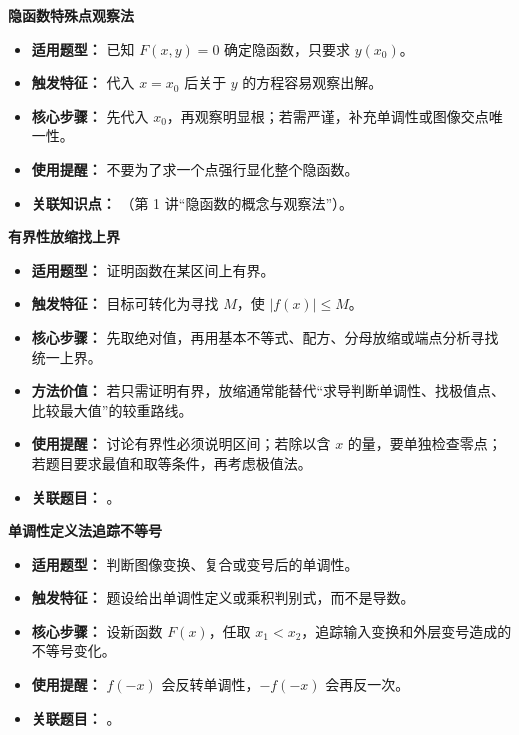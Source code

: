 \begin{knowledgeBox}
\textbf{隐函数特殊点观察法}

\begin{itemize}
  \item \textbf{适用题型：} 已知 \(F(x,y)=0\) 确定隐函数，只要求 \(y(x_0)\)。
  \item \textbf{触发特征：} 代入 \(x=x_0\) 后关于 \(y\) 的方程容易观察出解。
  \item \textbf{核心步骤：} 先代入 \(x_0\)，再观察明显根；若需严谨，补充单调性或图像交点唯一性。
  \item \textbf{使用提醒：} 不要为了求一个点强行显化整个隐函数。
  \item \textbf{关联知识点：} （第 1 讲“隐函数的概念与观察法”）。
\end{itemize}

\textbf{有界性放缩找上界}

\begin{itemize}
  \item \textbf{适用题型：} 证明函数在某区间上有界。
  \item \textbf{触发特征：} 目标可转化为寻找 \(M\)，使 \(|f(x)|\le M\)。
  \item \textbf{核心步骤：} 先取绝对值，再用基本不等式、配方、分母放缩或端点分析寻找统一上界。
  \item \textbf{方法价值：} 若只需证明有界，放缩通常能替代“求导判断单调性、找极值点、比较最大值”的较重路线。
  \item \textbf{使用提醒：} 讨论有界性必须说明区间；若除以含 \(x\) 的量，要单独检查零点；若题目要求最值和取等条件，再考虑极值法。
  \item \textbf{关联题目：} 。
\end{itemize}

\textbf{单调性定义法追踪不等号}

\begin{itemize}
  \item \textbf{适用题型：} 判断图像变换、复合或变号后的单调性。
  \item \textbf{触发特征：} 题设给出单调性定义或乘积判别式，而不是导数。
  \item \textbf{核心步骤：} 设新函数 \(F(x)\)，任取 \(x_1<x_2\)，追踪输入变换和外层变号造成的不等号变化。
  \item \textbf{使用提醒：} \(f(-x)\) 会反转单调性，\(-f(-x)\) 会再反一次。
  \item \textbf{关联题目：} 。
\end{itemize}


\end{knowledgeBox}
